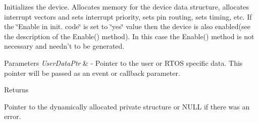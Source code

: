Initializes the device. Allocates memory for the device data structure, allocates interrupt vectors and sets interrupt priority, sets pin routing, sets timing, etc. If the \char`\"{}\-Enable
    in init. code\char`\"{} is set to \char`\"{}yes\char`\"{} value then the device is also enabled(see the description of the Enable() method). In this case the Enable() method is not necessary and needn't to be generated. 


\begin{DoxyParams}{Parameters}
{\em User\-Data\-Ptr} & -\/ Pointer to the user or R\-T\-O\-S specific data. This pointer will be passed as an event or callback parameter. \\
\hline
\end{DoxyParams}
\begin{DoxyReturn}{Returns}

\begin{DoxyItemize}
\item Pointer to the dynamically allocated private structure or N\-U\-L\-L if there was an error. 
\end{DoxyItemize}
\end{DoxyReturn}
